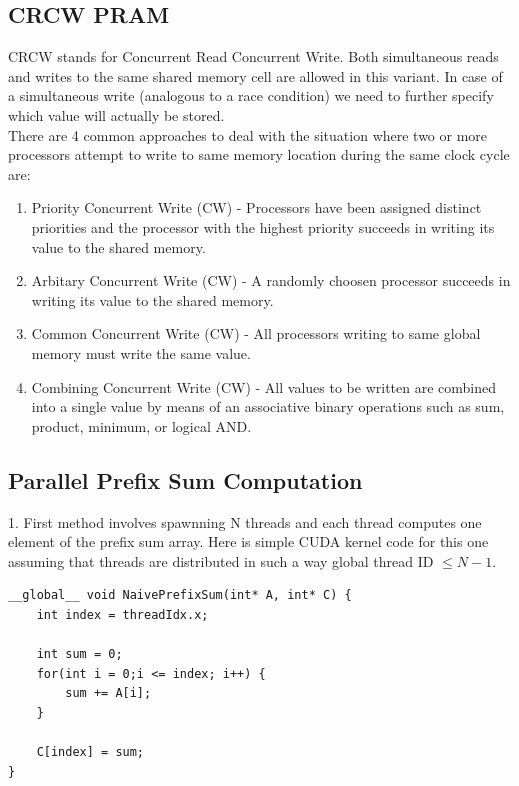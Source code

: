 \subsection*{CRCW PRAM}
CRCW stands for Concurrent Read Concurrent Write. Both simultaneous reads and writes to the same shared memory cell are allowed in this variant. In case of a simultaneous write (analogous to a race condition) we need to further specify which value will actually be stored. \\

There are 4 common approaches to deal with the situation where two or more processors attempt to write to same memory location during the same clock cycle are:
\begin{enumerate}
    \item Priority Concurrent Write (CW) - Processors have been assigned distinct priorities and the processor with the highest priority succeeds in writing its value to the shared memory.
    \item Arbitary Concurrent Write (CW) - A randomly choosen processor succeeds in writing its value to the shared memory.
    \item Common Concurrent Write (CW) - All processors writing to same global memory must write the same value.
    \item Combining Concurrent Write (CW) - All values to be written are combined into a single value by means of an associative binary operations such as sum, product, minimum, or logical AND.
\end{enumerate}

\subsection*{Parallel Prefix Sum Computation}
1. First method involves spawnning N threads and each thread computes one element of the prefix sum array. Here is simple CUDA kernel code for this one assuming that threads are distributed in such a way global thread ID $\leq N-1$.


\begin{lstlisting}
__global__ void NaivePrefixSum(int* A, int* C) {
    int index = threadIdx.x;

    int sum = 0;
    for(int i = 0;i <= index; i++) {
        sum += A[i];
    }

    C[index] = sum;
}
\end{lstlisting}

